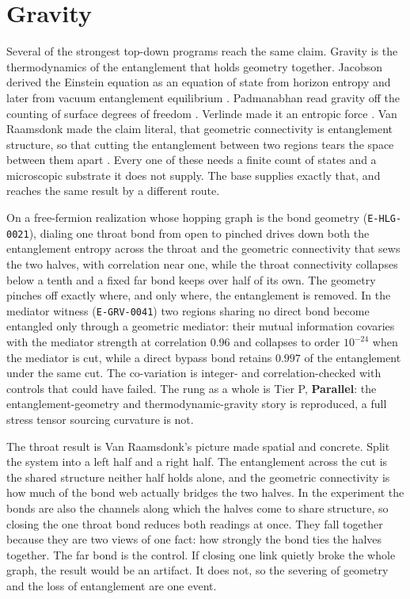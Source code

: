 \section{Gravity}

Several of the strongest top-down programs reach the same claim. Gravity is
the thermodynamics of the entanglement that holds geometry together. Jacobson
derived the Einstein equation as an equation of state from horizon entropy
\cite{jacobson1995} and later from vacuum entanglement equilibrium
\cite{jacobson2016}. Padmanabhan read gravity off the counting of surface
degrees of freedom \cite{padmanabhan2010}. Verlinde made it an entropic force
\cite{verlinde2011}. Van Raamsdonk made the claim literal, that geometric
connectivity is entanglement structure, so that cutting the entanglement between
two regions tears the space between them apart \cite{vanraamsdonk2010}. Every one
of these needs a finite count of states and a microscopic substrate it does not
supply. The base supplies exactly that, and reaches the same result by a different
route.

\begin{finding}
On a free-fermion realization whose hopping graph is the bond geometry
(\texttt{E-HLG-0021}), dialing one throat bond from open to pinched drives down both the
entanglement entropy across the throat and the geometric connectivity that sews the
two halves, with correlation near one, while the throat
connectivity collapses below a tenth and a fixed far bond keeps over half of its
own. The geometry pinches off exactly where, and only where, the entanglement is
removed. In the mediator witness (\texttt{E-GRV-0041}) two regions sharing no direct bond
become entangled only through a geometric mediator: their mutual information
covaries with the mediator strength at correlation $0.96$ and collapses to order
$10^{-24}$ when the mediator is cut, while a direct bypass bond retains $0.997$
of the entanglement under the same cut. The co-variation is integer- and
correlation-checked with controls that could have failed. The rung as a whole is
Tier P, \textbf{Parallel}: the entanglement-geometry and thermodynamic-gravity
story is reproduced, a full stress tensor sourcing curvature is not.
\end{finding}

The throat result is Van Raamsdonk's picture made spatial and concrete. Split
the system into a left half and a right half. The entanglement across the cut is
the shared structure neither half holds alone, and the geometric connectivity is
how much of the bond web actually bridges the two halves. In the experiment the
bonds are also the channels along which the halves come to share structure, so
closing the one throat bond reduces both readings at once. They fall together
because they are two views of one fact: how strongly the bond ties the halves
together. The far bond is the control. If closing one link quietly broke the
whole graph, the result would be an artifact. It does not, so the severing of
geometry and the loss of entanglement are one event.

